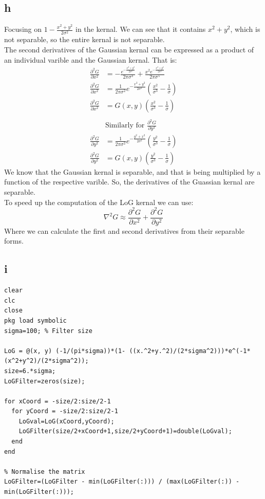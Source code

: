 \documentclass[11pt]{article}
\begin{document}
\subsection{h}
\label{sec:orgb880a6e}
Focusing on \(1-\frac{x^2+y^2}{2\sigma^2}\) in the kernal. We can see that it contains \(x^2+y^2\), which is not separable, so the entire kernal is not separable. \\
The second derivatives of the Gaussian kernal can be expressed as a product of an individual varible and the Gaussian kernal. That is:
\begin{align*}
\frac{\partial^2 G}{\partial x^2}&=-\frac{e^{-\frac{ x^{2} + y^2}{2 \sigma^{2}}}}{2 \pi \sigma^{3}} + \frac{x^{2} e^{-\frac{ x^{2} + y^2}{2 \sigma^{2}}}}{2 \pi \sigma^{5}} \\
\frac{\partial^2 G}{\partial x^2}&=\frac{1}{2\pi\sigma^2}e^{-\frac{x^2+y^2}{2\sigma^2}} \left( \frac{x^2}{\sigma^3}-\frac{1}{\sigma}\right) \\
\frac{\partial^2 G}{\partial x^2}&=G(x,y)\left( \frac{x^2}{\sigma^3}-\frac{1}{\sigma}\right) \\
& \\
& \textrm{Similarly for } \frac{\partial^2 G}{\partial y^2}\\
\frac{\partial^2 G}{\partial y^2}&=\frac{1}{2\pi\sigma^2}e^{-\frac{y^2+x^2}{2\sigma^2}} \left( \frac{y^2}{\sigma^3}-\frac{1}{\sigma}\right) \\
\frac{\partial^2 G}{\partial y^2}&=G(x,y)\left( \frac{y^2}{\sigma^3}-\frac{1}{\sigma}\right)
\end{align*}
We know that the Gaussian kernal is separable, and that is being multiplied by a function of the respective varible. So, the derivatives of the Guassian kernal are separable.\\
To speed up the computation of the LoG kernal we can use:
\[\nabla^2 G\approx \frac{\partial^2 G}{\partial x^2} + \frac{\partial^2 G}{\partial y^2}\]
Where we can calculate the first and second derivatives from their separable forms.
\subsection{i}
\label{sec:orgbfc54f2}
\begin{verbatim}
clear
clc
close
pkg load symbolic
sigma=100; % Filter size

LoG = @(x, y) (-1/(pi*sigma))*(1- ((x.^2+y.^2)/(2*sigma^2)))*e^(-1*(x^2+y^2)/(2*sigma^2));
size=6.*sigma;
LoGFilter=zeros(size);

for xCoord = -size/2:size/2-1
  for yCoord = -size/2:size/2-1
    LoGval=LoG(xCoord,yCoord);
    LoGFilter(size/2+xCoord+1,size/2+yCoord+1)=double(LoGval);
  end
end

% Normalise the matrix
LoGFilter=(LoGFilter - min(LoGFilter(:))) / (max(LoGFilter(:)) - min(LoGFilter(:)));

\end{verbatim}
\end{document}
